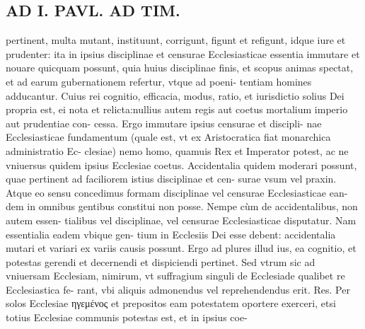 \documentclass{article}
\begin{document}
\begin{pages}
\section*{AD I. PAVL. AD TIM. }
\marginpar{[ p.244 ]}\pstart pertinent, multa mutant, instituunt, corrigunt, figunt et refigunt, idque iure et prudenter: ita in ipsius disciplinae et censurae Ecclesiasticae essentia immutare et nouare quicquam possunt, quia huius disciplinae finis, et scopus animas spectat, et ad earum gubernationem refertur, vtque ad poeni- tentiam homines adducantur. Cuius rei cognitio, efficacia, modus, ratio, et iurisdictio solius Dei propria est, ei nota et relicta:nullius autem regis aut coetus mortalium imperio aut prudentiae con- cessa. Ergo immutare ipsius censurae et discipli- nae Ecclesiasticae fundamentum (quale est, vt ex Aristocratica fiat monarchica administratio Ec- clesiae) nemo homo, quamuis Rex et Imperator potest, ac ne vniuersus quidem ipsius Ecclesiae coetus. Accidentalia quidem moderari possunt, quae pertinent ad faciliorem istius disciplinae et cen- surae vsum vel praxin. Atque eo sensu concedimus formam disciplinae vel censurae Ecclesiasticae ean- dem in omnibus gentibus constitui non posse. Nempe cùm de accidentalibus, non autem essen- tialibus vel disciplinae, vel censurae Ecclesiasticae disputatur. Nam essentialia eadem vbique gen- tium in Ecclesiis Dei esse debent: accidentalia mutari et variari ex variis causis possunt. Ergo ad plures illud ius, ea cognitio, et potestas gerendi et decernendi et dispiciendi pertinet. Sed vtrum sic ad vniuersam Ecclesiam, nimirum, vt suffragium singuli de Ecclesiade qualibet re Ecclesiastica fe- rant, vbi aliquis admonendus vel reprehendendus erit. Res. Per solos Ecclesiae ηγεμένος et prepositos eam potestatem oportere exerceri, etsi totius Ecclesiae communis potestas est, et in ipsius coe-  \pend

\end{pages}
\end{document}
